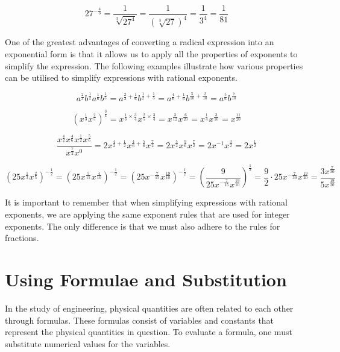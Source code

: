 \begin{example}
\[
27^{-\frac{4}{3}} = \frac{1}{\sqrt[3]{27^4}} = \frac{1}{\left(\sqrt[3]{27}\right)^4} = \frac{1}{3^4} = \frac{1}{81}
\]    
\end{example}

One of the greatest advantages of converting a radical expression into an exponential form is that it allows us to apply all the properties of exponents to simplify the expression. The following examples illustrate how various properties can be utilised to simplify expressions with rational exponents.

\begin{example}

\[
a^{\frac{2}{3}}b^{\frac{1}{2}}a^{\frac{1}{6}}b^{\frac{1}{5}} = a^{\frac{2}{3}+\frac{1}{6}}b^{\frac{1}{2}+\frac{1}{5}} = a^{\frac{4}{6}+\frac{1}{6}}b^{\frac{5}{10}+\frac{2}{10}} = a^{\frac{5}{6}}b^{\frac{7}{10}}
\]

\[
\left( x^{\frac{1}{3}} x^{\frac{2}{5}} \right)^{\frac{3}{4}} = x^{\frac{1}{3} \times \frac{3}{4}} x^{\frac{2}{5} \times \frac{3}{4}} = x^{\frac{3}{12}} x^{\frac{6}{20}} = x^{\frac{1}{4}} x^{\frac{3}{10}} = x^{\frac{11}{20}}
\]

\[
\frac{x^{\frac{4}{2}}x^{\frac{4}{6}}x^{\frac{1}{2}}x^{\frac{5}{6}}}{x^{\frac{7}{2}}x^0} = 2x^{\frac{4}{2}+\frac{1}{2}}x^{\frac{4}{6}+\frac{5}{6}} x^{\frac{7}{2}} = 2x^{\frac{5}{2}} x^{\frac{9}{6}} x^{\frac{7}{2}} = 2x^{-1} x^{\frac{3}{2}} = 2x^{\frac{1}{2}}
\]

\[
\left( 25x^{\frac{1}{3}} x^{\frac{2}{5}} \right)^{-\frac{1}{2}} = \left( 25x^{\frac{5}{15}} x^{\frac{4}{10}} \right)^{-\frac{1}{2}} = \left( 25x^{-\frac{7}{15}} x^{\frac{19}{10}} \right)^{-\frac{1}{2}} = \left( \frac{9}{25x^{-\frac{7}{15}}x^{\frac{19}{10}}} \right)^{\frac{1}{2}} = \frac{9}{2} \cdot 25x^{-\frac{7}{30}} x^{\frac{19}{20}} = \frac{3x^{\frac{7}{30}}}{5x^{\frac{19}{20}}}
\]
\end{example}

It is important to remember that when simplifying expressions with rational exponents, we are applying the same exponent rules that are used for integer exponents. The only difference is that we must also adhere to the rules for fractions.

\section{Using Formulae and Substitution}
In the study of engineering, physical quantities are often related to each other through formulas. These formulas consist of variables and constants that represent the physical quantities in question. To evaluate a formula, one must substitute numerical values for the variables.

